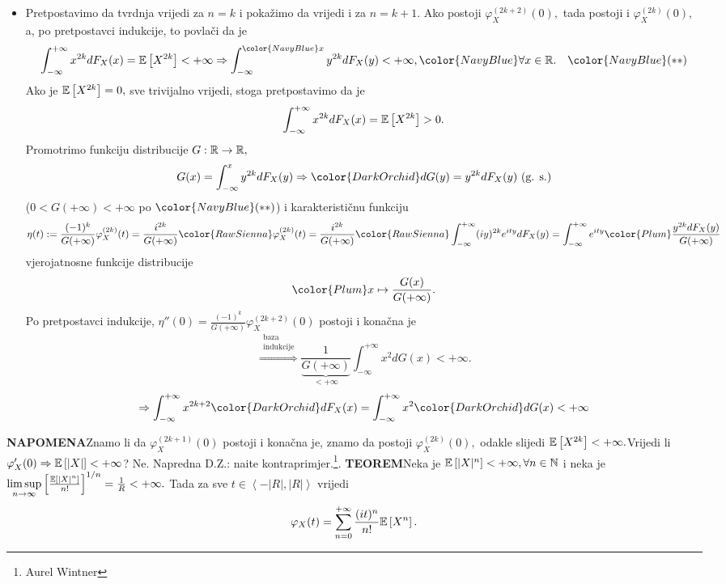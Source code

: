 \documentclass{article}
\newcommand{\mylimsup}{\underset{n\to\infty}{\lim\sup}}
\begin{document}
\begin{itemize}
    \item[\ding{228}] Pretpostavimo da tvrdnja vrijedi za \(n=k\) i pokažimo da vrijedi i za \(n=k+1.\) Ako postoji \(\varphi_X^{(2k+2)}(0),\) tada postoji i \(\varphi_X^{(2k)}(0),\) a, po pretpostavci indukcije, to povlači da je \[\int_{-\infty}^{+\infty}x^{2k}dF_X(x)=\Bbb E\left[X^{2k}\right]<+\infty\Rightarrow \int_{-\infty}^{{\color{NavyBlue}x}}y^{2k}dF_X(y)<+\infty,{\color{NavyBlue}\forall x\in\Bbb R}.\quad{\color{NavyBlue}(**)}\] Ako je \(\Bbb E\left[X^{2k}\right]=0,\) sve trivijalno vrijedi, stoga pretpostavimo da je \[\int_{-\infty}^{+\infty}x^{2k}dF_X(x)=\Bbb E\left[X^{2k}\right]>0.\] Promotrimo funkciju distribucije \(G:\Bbb R\to\Bbb R,\) \[G(x)=\int_{-\infty}^xy^{2k}dF_X(y)\Rightarrow {\color{DarkOrchid}dG(y)=y^{2k}dF_X(y)}\text{ (g. s.)}\] (\(0<G(+\infty)<+\infty\) po \(\color{NavyBlue}(**)\)) i karakterističnu funkciju \[\eta(t):=\frac{(-1)^k}{G(+\infty)}\varphi_X^{(2k)}(t)=\frac{i^{2k}}{G(+\infty)}{\color{RawSienna}\varphi_X^{(2k)}(t)}=\frac{i^{2k}}{G(+\infty)}{\color{RawSienna}\int_{-\infty}^{+\infty}(iy)^{2k}e^{ity}dF_X(y)}=\int_{-\infty}^{+\infty}e^{ity}{\color{Plum}\frac{y^{2k}dF_X(y)}{G(+\infty)}}\] vjerojatnosne funkcije distribucije \[\color{Plum}x\mapsto\frac{G(x)}{G(+\infty)}.\] Po pretpostavci indukcije, \(\eta''(0)=\frac{(-1)^k}{G(+\infty)}\varphi_X^{(2k+2)}(0)\) postoji i konačna je \[\overset{\substack{\text{baza}\\\text{indukcije}}}{\Rightarrow}\frac1{\underbrace{G(+\infty)}_{<+\infty}}\int_{-\infty}^{+\infty}x^2dG(x)<+\infty.\]  \[\Rightarrow\int_{-\infty}^{+\infty}x^{2k+2}{\color{DarkOrchid}dF_X(x)}=\int_{-\infty}^{+\infty}x^2{\color{DarkOrchid}dG(x)}<+\infty\]
\end{itemize}
\textbf{NAPOMENA}\newline Znamo li da \(\varphi_X^{(2k+1)}(0)\) postoji i konačna je, znamo da postoji \(\varphi_X^{(2k)}(0),\) odakle slijedi \(\Bbb E\left[X^{2k}\right]<+\infty.\)\newline Vrijedi li \(\varphi_X'(0)\Rightarrow\Bbb E\left[|X|\right]<+\infty\)? Ne. Napredna D.Z.: na\dj{}ite kontraprimjer.\footnote[23]{Aurel Wintner}.\newline\newline
\textbf{TEOREM}\newline Neka je \(\Bbb E\left[|X|^n\right]<+\infty,\forall n\in\Bbb N\) i neka je \(\mylimsup \left[\frac{\Bbb E\left[|X|^n\right]}{n!}\right]^{1/n}=\frac1R<+\infty.\) Tada za sve \(t\in\left\langle-|R|,|R|\right\rangle\) vrijedi \[\varphi_X(t)=\sum_{n=0}^{+\infty}\frac{(it)^n}{n!}\Bbb E\left[X^n\right].\] 
\end{document}

